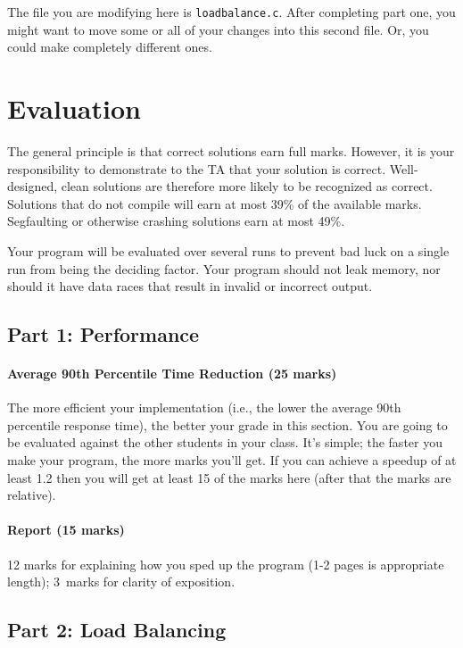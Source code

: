 \documentclass[letterpaper,10pt]{article}
\begin{document}
The file you are modifying here is \texttt{loadbalance.c}. After completing part one, you might want to move some or all of your changes into this second file. Or, you could make completely different ones.

\section*{Evaluation}

The general principle is that correct solutions earn full marks.
However, it is your responsibility to demonstrate to the TA
that your solution is correct. Well-designed, clean solutions 
are therefore more likely to be recognized as correct. Solutions that do not compile will earn at most 39\% of the available
marks. Segfaulting or otherwise crashing solutions earn
at most 49\%.

Your program will be evaluated over several runs to prevent bad luck on a single run from being the deciding factor. Your program should not leak memory, nor should it have data races that result in invalid or incorrect output. 

\subsection*{Part 1: Performance}

\paragraph{Average 90th Percentile Time Reduction (25 marks)} The more efficient your implementation (i.e., the lower the average 90th percentile response time), the better your grade in this section.  You are going to be evaluated against the other students in your class. It's simple; the faster you make your program, the more marks
you'll get. If you can achieve a speedup of at least 1.2 then you will get at least 15 of the marks here (after that the marks are relative).

\paragraph{Report (15 marks)} 12 marks for explaining how you sped up the program (1-2 pages is appropriate length); 3~marks for clarity of exposition.

\subsection*{Part 2: Load Balancing}
\end{document}
